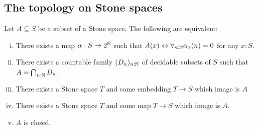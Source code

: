 \subsection{The topology on Stone spaces}
\begin{theorem}\label{StoneClosedSubsets}
  Let $A\subseteq S$ be a subset of a Stone space. The following are equivalent:
  \begin{enumerate}[(i)]
    \item There exists a map $\alpha:S \to 2^{\mathbb{N}}$ such that 
      $A (x) \leftrightarrow \forall_{n:\mathbb{N}} \alpha_x(n) = 0$ for any $x:S$. 
    \item There exists a countable family 
      $(D_n)_{n:\mathbb{N}}$ 
      of decidable subsets of $S$ such that $A = \bigcap_{n:\mathbb{N}} D_n$. 
    \item There exists a Stone space $T$ and some embedding $T\to S$ which image is $A$
    \item There exists a Stone space $T$ and some map $T\to S$ which image is $A$. 
    \item $A$ is closed.
  \end{enumerate}
\end{theorem}
